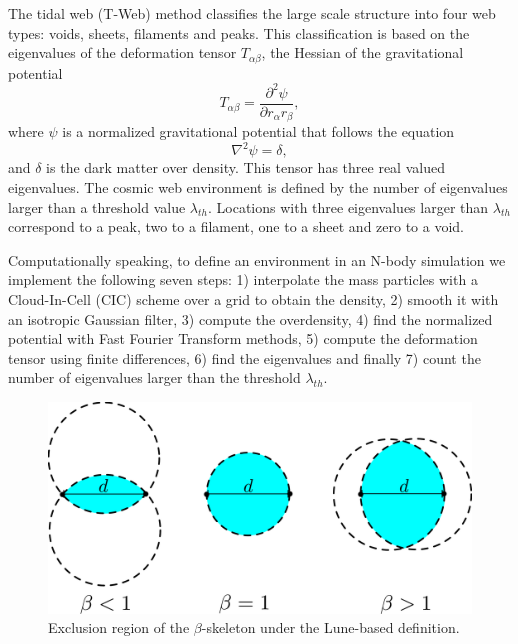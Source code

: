\documentclass[usenatbib]{mnras}
\begin{document}
The tidal web (T-Web) method \citep{Hahn2007,Forero-Romero2009}
classifies the large scale structure into four web types: voids,
sheets, filaments and peaks.   
This classification is based on the eigenvalues of the deformation
tensor $T_{\alpha\beta}$, the Hessian of the gravitational potential 
\begin{equation}
T_{\alpha\beta}=\frac{\partial^2\psi}{\partial r_{\alpha}r_{\beta}},
\end{equation}
%
where $\psi$ is a normalized gravitational potential that follows the equation
\begin{equation}
    \nabla^2 \psi = \delta,
\end{equation}
%
and $\delta$ is the dark matter over density.
This tensor has three real valued eigenvalues. 
The cosmic web environment is defined by the number of eigenvalues
larger than a threshold value $\lambda_{th}$.
Locations with three eigenvalues larger than $\lambda_{th}$ correspond
to a peak, two to a filament, one to a sheet and zero to a void. 

Computationally speaking, to define an environment in an N-body
simulation we implement the following seven steps: 1) interpolate the
mass particles with a Cloud-In-Cell  (CIC) scheme over a grid to
obtain the density, 2) smooth it with an isotropic Gaussian filter,
3) compute the overdensity, 4) find the normalized potential with Fast
Fourier Transform  methods, 5) compute the deformation tensor using
finite differences, 6) find the eigenvalues and finally 7) count the
number of eigenvalues larger than the threshold $\lambda_{th}$. 

\begin{figure}
\centering
 \includegraphics[scale=0.18]{Figs/p_beta.pdf}
 \caption{Exclusion region of the $\beta$-skeleton under the Lune-based definition. }  
 \label{fig:beta}
\end{figure}
\end{document}
